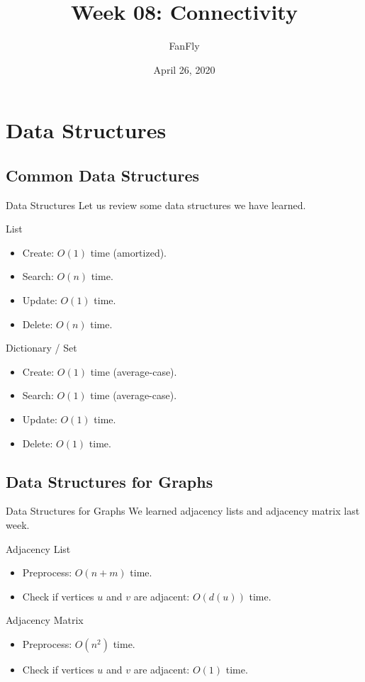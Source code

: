 \documentclass{beamer}
\title{Week 08: Connectivity}
\author{FanFly}
\date{April 26, 2020}
\begin{document}
\begin{frame}
  \titlepage
\end{frame}

\section{Data Structures}
\subsection{Common Data Structures}
\begin{frame}{Data Structures}
  Let us review some data structures we have learned. \pause
  \begin{block}{List}
    \pause
    \begin{itemize}
      \item Create: $O(1)$ time (amortized). \pause
      \item Search: $O(n)$ time. \pause
      \item Update: $O(1)$ time. \pause
      \item Delete: $O(n)$ time.
    \end{itemize}
  \end{block}
  \pause
  \begin{block}{Dictionary / Set}
    \begin{itemize}
      \pause
      \item Create: $O(1)$ time (average-case). \pause
      \item Search: $O(1)$ time (average-case). \pause
      \item Update: $O(1)$ time. \pause
      \item Delete: $O(1)$ time.
    \end{itemize}
  \end{block}
\end{frame}

\subsection{Data Structures for Graphs}
\begin{frame}{Data Structures for Graphs}
  We learned adjacency lists and adjacency matrix last week.
  \begin{block}{Adjacency List}
    \pause
    \begin{itemize}
      \item Preprocess: $O(n + m)$ time. \pause
      \item Check if vertices $u$ and $v$ are adjacent: $O(d(u))$ time.
    \end{itemize}
  \end{block}
  \pause
  \begin{block}{Adjacency Matrix}
    \pause
    \begin{itemize}
      \item Preprocess: $O(n^2)$ time. \pause
      \item Check if vertices $u$ and $v$ are adjacent: $O(1)$ time.
    \end{itemize}
  \end{block}
\end{frame}
\end{document}
